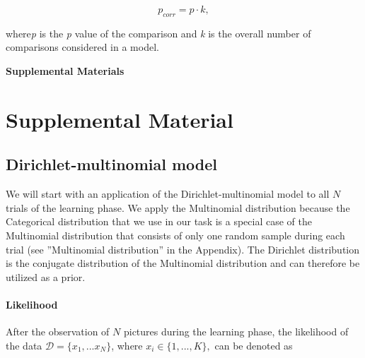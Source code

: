 \documentclass[a4paper,12pt]{article} 			%
\begin{document}
\begin{equation}
p_{corr} =   p \cdot k, 
\end{equation}

\noindent
where\textit{p} is the \textit{p} value of the comparison and \textit{k} is the overall number of comparisons considered in a model. 





 

\pagebreak
\begin{center}
\textbf{\large Supplemental Materials}
\end{center}
\setcounter{equation}{0}
\setcounter{figure}{0}
\setcounter{table}{0}
\setcounter{page}{1}
\makeatletter
\renewcommand{\theequation}{S\arabic{equation}}
\renewcommand{\thefigure}{S\arabic{figure}}
\renewcommand{\bibnumfmt}[1]{[S#1]}
\renewcommand{\citenumfont}[1]{S#1}

\section{Supplemental Material}
\subsection*{Dirichlet-multinomial model}
We will start with an application of the Dirichlet-multinomial model to all $N$ trials of the learning phase. We apply the Multinomial distribution because the Categorical distribution that we use in our task is a special case of the Multinomial distribution that consists of only one random sample during each trial (see ''Multinomial distribution'' in the Appendix). The Dirichlet distribution is the conjugate distribution of the Multinomial distribution and can therefore be utilized as a prior. 

\paragraph{Likelihood}
After the observation of $N$ pictures during the learning phase, the likelihood of the data $\boldsymbol{\mathcal{D}}=\{x_1,...x_N\}$, where $x_i \in \{1,...,K\},$ can be denoted as
\end{document}
